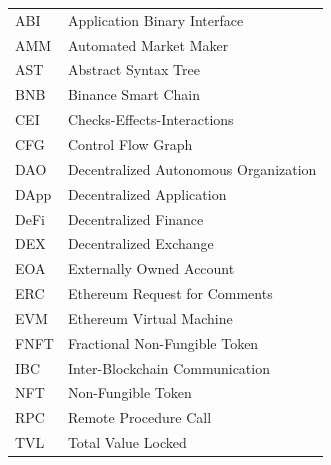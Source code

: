 \begin{longtable}{@{} l l @{}}
    ABI   & Application Binary Interface \\
    AMM   & Automated Market Maker \\
    AST   & Abstract Syntax Tree \\
    BNB   & Binance Smart Chain \\
    CEI   & Checks-Effects-Interactions \\
    CFG   & Control Flow Graph \\
    DAO   & Decentralized Autonomous Organization \\
    DApp  & Decentralized Application \\
    DeFi  & Decentralized Finance \\
    DEX   & Decentralized Exchange \\
    EOA   & Externally Owned Account \\
    ERC   & Ethereum Request for Comments \\
    EVM   & Ethereum Virtual Machine \\
    FNFT  & Fractional Non-Fungible Token \\
    IBC   & Inter-Blockchain Communication \\
    NFT   & Non-Fungible Token \\
    RPC   & Remote Procedure Call \\
    TVL   & Total Value Locked \\
\end{longtable}
